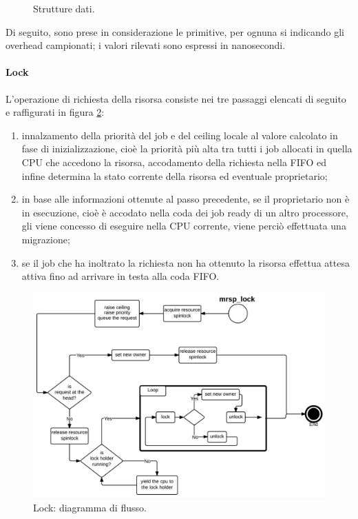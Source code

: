 \begin{figure}
\centering
{}
\caption{Strutture dati.}
\label{fig:datas}
\end{figure}

Di seguito, sono prese in considerazione le primitive, per ognuna si indicando gli overhead campionati; i valori rilevati sono espressi in nanosecondi.

\paragraph{Lock}  L'operazione di richiesta della risorsa consiste nei tre passaggi elencati di seguito e raffigurati in figura \ref{fig:mrsplock}:

\begin{enumerate}
	\item innalzamento della priorità del job e del ceiling locale al valore calcolato in fase di inizializzazione, cioè la priorità più alta tra tutti i job allocati in quella CPU che accedono la risorsa, accodamento della richiesta nella FIFO ed infine determina la stato corrente della risorsa ed eventuale proprietario;
	\item in base alle informazioni ottenute al passo precedente, se il proprietario non è in esecuzione, cioè è accodato nella coda dei job ready di un altro processore, gli viene concesso di eseguire nella CPU corrente, viene perciò effettuata una migrazione;
	\item se il job che ha inoltrato la richiesta non ha ottenuto la risorsa effettua attesa attiva fino ad arrivare in testa alla coda FIFO.
\end{enumerate}

\begin{figure}
\includegraphics[width=\linewidth]{images/mrsp_lock.jpeg}
\caption{Lock: diagramma di flusso.}
\label{fig:mrsplock}
\end{figure}

